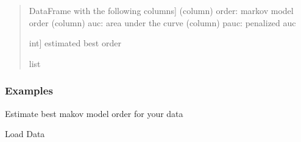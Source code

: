 \documentclass[letterpaper,10pt,english]{sphinxmanual}
\begin{document}
\begin{fulllineitems}
\begin{quote}
\begin{description}
\begin{description}
\sphinxlineitem{auc}{[}DataFrame with the following columns{]}
\sphinxAtStartPar
(column) order: markov model order
(column) auc: area under the curve
(column) pauc: penalized auc

\sphinxlineitem{suggested order}{[}int{]}
\sphinxAtStartPar
estimated best order

\end{description}


\sphinxAtStartPar
list

\end{description}\end{quote}
\subsubsection*{Examples}

\sphinxAtStartPar
Estimate best makov model order for your data

\sphinxAtStartPar
Load Data

\begin{sphinxVerbatim}[commandchars=\\\{\}]
 
  
\end{sphinxVerbatim}

\begin{sphinxVerbatim}[commandchars=\\\{\}]
   
\end{sphinxVerbatim}

\end{fulllineitems}
\end{document}
